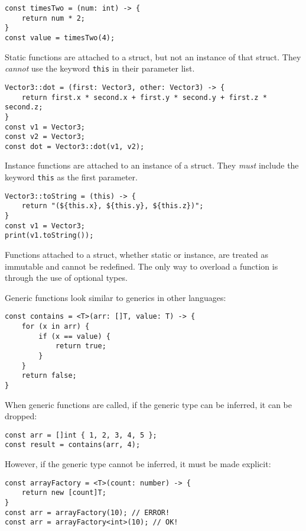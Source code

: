 \documentclass[12pt]{article}
\begin{document}
\begin{lstlisting}
const timesTwo = (num: int) -> {
	return num * 2;
}
const value = timesTwo(4);
\end{lstlisting}

Static functions are attached to a struct, but not an instance of that struct. They \emph{cannot} use the keyword \lstinline!this! in their parameter list.

\begin{lstlisting}
Vector3::dot = (first: Vector3, other: Vector3) -> {
	return first.x * second.x + first.y * second.y + first.z * second.z;
}
const v1 = Vector3;
const v2 = Vector3;
const dot = Vector3::dot(v1, v2);
\end{lstlisting}

Instance functions are attached to an instance of a struct. They \emph{must} include the keyword \lstinline!this! as the first parameter.

\begin{lstlisting}
Vector3::toString = (this) -> {
	return "(${this.x}, ${this.y}, ${this.z})";
}
const v1 = Vector3;
print(v1.toString());
\end{lstlisting}

Functions attached to a struct, whether static or instance, are treated as immutable and cannot be redefined. The only way to overload a function is through the use of optional types.

Generic functions look similar to generics in other languages:

\begin{lstlisting}
const contains = <T>(arr: []T, value: T) -> {
	for (x in arr) {
		if (x == value) {
			return true;
		}
	}
	return false;
}
\end{lstlisting}

When generic functions are called, if the generic type can be inferred, it can be dropped:

\begin{lstlisting}
const arr = []int { 1, 2, 3, 4, 5 };
const result = contains(arr, 4);
\end{lstlisting}

However, if the generic type cannot be inferred, it must be made explicit:

\begin{lstlisting}
const arrayFactory = <T>(count: number) -> {
	return new [count]T;
}
const arr = arrayFactory(10); // ERROR!
const arr = arrayFactory<int>(10); // OK!
\end{lstlisting}
\end{document}
